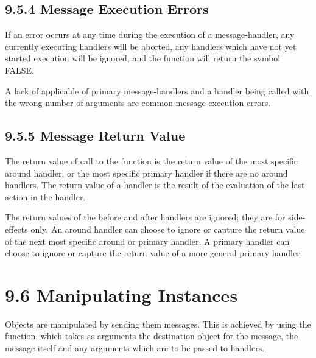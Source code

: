 \documentclass[letterpaper,10pt,english]{sphinxmanual}
\begin{document}
\subsection{9.5.4 Message Execution Errors}
\label{\detokenize{cool:message-execution-errors}}
If an error occurs at any time during the execution of a
message-handler, any currently executing handlers will be aborted, any
handlers which have not yet started execution will be ignored, and the
 function will return the symbol FALSE.

A lack of applicable of primary message-handlers and a handler being
called with the wrong number of arguments are common message execution
errors.


\subsection{9.5.5 Message Return Value}
\label{\detokenize{cool:message-return-value}}
The return value of call to the  function is the return value of
the most specific around handler, or the most specific primary handler
if there are no around handlers. The return value of a handler is the
result of the evaluation of the last action in the handler.

The return values of the before and after handlers are ignored; they are
for side-effects only. An around handler can choose to ignore or capture
the return value of the next most specific around or primary handler. A
primary handler can choose to ignore or capture the return value of a
more general primary handler.


\section{9.6 Manipulating Instances}
\label{\detokenize{cool:manipulating-instances}}
Objects are manipulated by sending them messages. This is achieved by
using the  function, which takes as arguments the destination
object for the message, the message itself and any arguments which are
to be passed to handlers.


\begin{sphinxVerbatim}[commandchars=\\\{\}]
   
\end{sphinxVerbatim}
\end{document}
